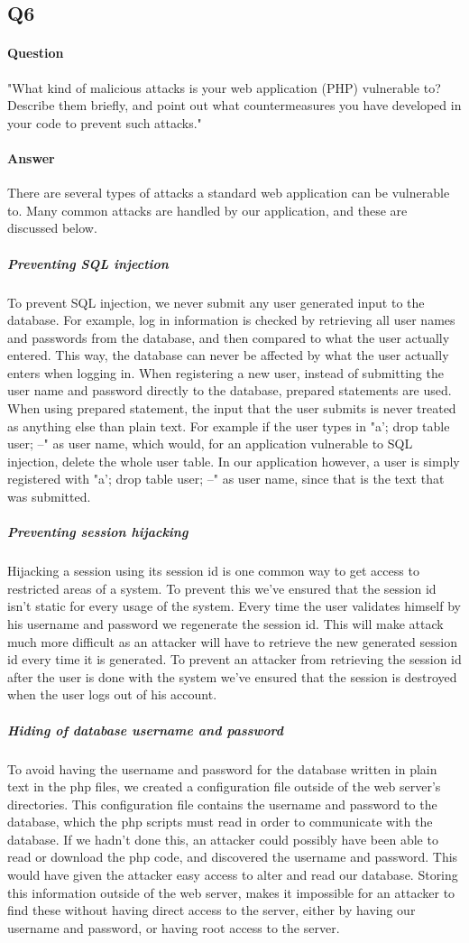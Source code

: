 \documentclass[11pt, a4paper]{article}
\begin{document}
\subsection{Q6}
\paragraph{Question}
"What kind of malicious attacks is your web application (PHP) vulnerable to? Describe them briefly, and point out what countermeasures you have developed in your code to prevent such attacks."
\paragraph{Answer}
There are several types of attacks a standard web application can be vulnerable to. Many common attacks are handled by our application, and these are discussed below.
\subparagraph{Preventing SQL injection}
To prevent SQL injection, we never submit any user generated input to the database. For example, log in information is checked by retrieving all user names and passwords from the database, and then compared to what the user actually entered. This way, the database can never be affected by what the user actually enters when logging in.
When registering a new user, instead of submitting the user name and password directly to the database, prepared statements are used. When using prepared statement, the input that the user submits is never treated as anything else than plain text. For example if the user types in "a'; drop table user; --" as user name, which would, for an application vulnerable to SQL injection, delete the whole user table. In our application however, a user is simply registered with "a'; drop table user; --" as user name, since that is the text that was submitted.
\subparagraph{Preventing session hijacking}
Hijacking a session using its session id is one common way to get access to restricted areas of a system. To prevent this we've ensured that the session id isn't static for every usage of the system. Every time the user validates himself by his username and password we regenerate the session id. This will make attack much more difficult as an attacker will have to retrieve the new generated session id every time it is generated. To prevent an attacker from retrieving the session id after the user is done with the system we've ensured that the session is destroyed when the user logs out of his account. 
\subparagraph{Hiding of database username and password}
To avoid having the username and password for the database written in plain text in the php files, we created a configuration file outside of the web server's directories. This configuration file contains the username and password to the database, which the php scripts must read in order to communicate with the database. If we hadn't done this, an attacker could possibly have been able to read or download the php code, and discovered the username and password. This would have given the attacker easy access to alter and read our database. Storing this information outside of the web server, makes it impossible for an attacker to find these without having direct access to the server, either by having our username and password, or having root access to the server. 
\end{document}
